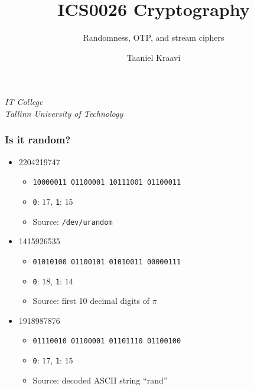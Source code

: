 
\usepackage{cryslides}
\usepackage{crygame}

\usepackage{soul}

\usetikzlibrary{positioning,calc}

\graphicspath{ {../../images/} }

\title{ICS0026 Cryptography}
\subtitle{Randomness, OTP, and stream ciphers}
\date{}
\author{Taaniel Kraavi}
\institute%
{%
  \textit{IT College}\\
  \textit{Tallinn University of Technology}
}


\begin{frame}[plain]
  \titlepage
\end{frame}

\begin{frame}
  \frametitle{Is it random?}

  \begin{itemize}
    \item<1-> 2204219747
    \begin{itemize}
      \item<2-> \texttt{10000011 01100001 10111001 01100011}
      \item<2-> \texttt{0}: $17$, \texttt{1}: $15$
      \item<3-> Source: \texttt{/dev/urandom}
    \end{itemize}
    \item<1-> 1415926535
    \begin{itemize}
      \item<2-> \texttt{01010100 01100101 01010011 00000111}
      \item<2-> \texttt{0}: $18$, \texttt{1}: $14$
      \item<4-> Source: first 10 decimal digits of $\pi$
    \end{itemize}
    \item<1-> 1918987876
    \begin{itemize}
      \item<2-> \texttt{01110010 01100001 01101110 01100100}
      \item<2-> \texttt{0}: $17$, \texttt{1}: $15$
      \item<5-> Source: decoded ASCII string \enquote{rand}
    \end{itemize}
  \end{itemize}
\end{frame}

